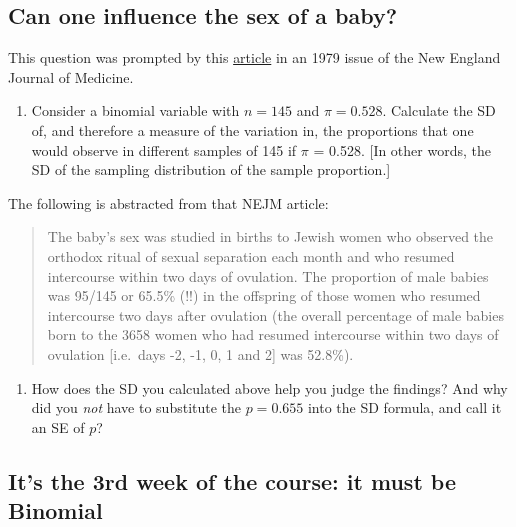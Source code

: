 \documentclass[]{book}
\providecommand{\tightlist}{%
  \setlength{\itemsep}{0pt}\setlength{\parskip}{0pt}}
\begin{document}
\hypertarget{can-one-influence-the-sex-of-a-baby}{%
\subsection{Can one influence the sex of a baby?}\label{can-one-influence-the-sex-of-a-baby}}

This question was prompted by this \href{http://www.biostat.mcgill.ca/hanley/statbook/SexRatioOvulationNEJM1979.pdf}{article} in an 1979 issue of the New England Journal of Medicine.

\begin{enumerate}
\def\labelenumi{\arabic{enumi}.}
\tightlist
\item
  Consider a binomial variable with \(n = 145\) and \(\pi = 0.528\). Calculate the SD of, and therefore a measure of the variation in, the proportions that one would observe in different samples of 145 if \(\pi\) = 0.528. {[}In other words, the SD of the sampling distribution of the sample proportion.{]}
\end{enumerate}

The following is abstracted from that NEJM article:

\begin{quote}
The baby's sex was studied in births to Jewish women who observed the orthodox ritual of sexual separation each month and who resumed intercourse within two days of ovulation. The proportion of male babies was 95/145 or 65.5\% (!!) in the offspring of those women who resumed intercourse two days after ovulation (the overall percentage of male babies born to the 3658 women who had resumed intercourse within two days of ovulation {[}i.e.~days -2, -1, 0, 1 and 2{]} was 52.8\%).
\end{quote}

\begin{enumerate}
\def\labelenumi{\arabic{enumi}.}
\setcounter{enumi}{1}
\tightlist
\item
  How does the SD you calculated above help you judge the findings? And why did you \emph{not} have to substitute the \(p=0.655\) into the SD formula, and call it an SE of \(p\)?
\end{enumerate}

\hypertarget{its-the-3rd-week-of-the-course-it-must-be-binomial}{%
\subsection{It's the 3rd week of the course: it must be Binomial}\label{its-the-3rd-week-of-the-course-it-must-be-binomial}}
\end{document}
